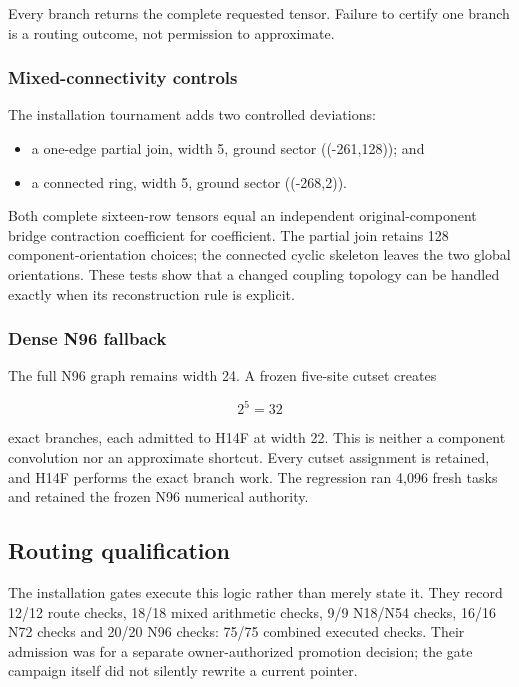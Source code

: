 Every branch returns the complete requested tensor. Failure to certify
one branch is a routing outcome, not permission to approximate.

\subsubsection{Mixed-connectivity
controls}\label{viii-ch01-mixed-connectivity-controls}

The installation tournament adds two controlled deviations:

\begin{itemize}
\tightlist
\item
  a one-edge partial join, width 5, ground sector ((-261,128)); and
\item
  a connected ring, width 5, ground sector ((-268,2)).
\end{itemize}

Both complete sixteen-row tensors equal an independent
original-component bridge contraction coefficient for coefficient. The
partial join retains 128 component-orientation choices; the connected
cyclic skeleton leaves the two global orientations. These tests show
that a changed coupling topology can be handled exactly when its
reconstruction rule is explicit.

\subsubsection{Dense N96 fallback}\label{viii-ch01-dense-n96-fallback}

The full N96 graph remains width 24. A frozen five-site cutset creates

\[
2^5=32
\]

exact branches, each admitted to H14F at width 22. This is neither a
component convolution nor an approximate shortcut. Every cutset
assignment is retained, and H14F performs the exact branch work. The
regression ran 4,096 fresh tasks and retained the frozen N96 numerical
authority.

\subsection{Routing qualification}\label{viii-ch01-failure-correction-and-routing-discipline}

The installation gates execute this logic rather than merely state it.
They record 12/12 route checks, 18/18 mixed arithmetic checks, 9/9
N18/N54 checks, 16/16 N72 checks and 20/20 N96 checks: 75/75 combined
executed checks. Their admission was for a separate owner-authorized
promotion decision; the gate campaign itself did not silently rewrite a
current pointer.

